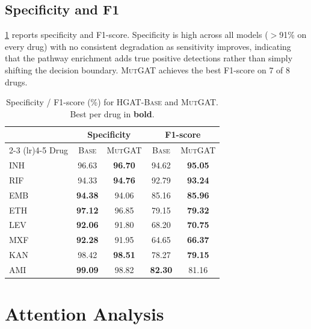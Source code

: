 \documentclass{article}
\theoremstyle{plain}
\theoremstyle{definition}
\theoremstyle{remark}
\begin{document}
\subsection{Specificity and F1}

\cref{tab:specificity_f1} reports specificity and F1-score. Specificity is high across all models ($>$91\% on every drug) with no consistent degradation as sensitivity improves, indicating that the pathway enrichment adds true positive detections rather than simply shifting the decision boundary. \textsc{MutGAT} achieves the best F1-score on 7 of 8 drugs.

\begin{table}[t]
\caption{Specificity / F1-score (\%) for \textsc{HGAT-Base} and \textsc{MutGAT}. Best per drug in \textbf{bold}.}
\label{tab:specificity_f1}
\vskip 0.1in
\begin{center}
\begin{small}
\begin{tabular}{lcccc}
\toprule
 & \multicolumn{2}{c}{Specificity} & \multicolumn{2}{c}{F1-score} \\
\cmidrule(lr){2-3} \cmidrule(lr){4-5}
Drug & \textsc{Base} & \textsc{MutGAT} & \textsc{Base} & \textsc{MutGAT} \\
\midrule
INH & 96.63 & \textbf{96.70} & 94.62 & \textbf{95.05} \\
RIF & 94.33 & \textbf{94.76} & 92.79 & \textbf{93.24} \\
EMB & \textbf{94.38} & 94.06 & 85.16 & \textbf{85.96} \\
ETH & \textbf{97.12} & 96.85 & 79.15 & \textbf{79.32} \\
LEV & \textbf{92.06} & 91.80 & 68.20 & \textbf{70.75} \\
MXF & \textbf{92.28} & 91.95 & 64.65 & \textbf{66.37} \\
KAN & 98.42 & \textbf{98.51} & 78.27 & \textbf{79.15} \\
AMI & \textbf{99.09} & 98.82 & \textbf{82.30} & 81.16 \\
\bottomrule
\end{tabular}
\end{small}
\end{center}
\end{table}


\section{Attention Analysis}
\label{sec:analysis}
\end{document}
